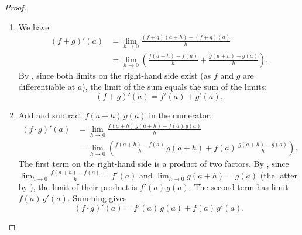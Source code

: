 \begin{proof}
    \begin{enumerate}
        \item We have
            \begin{align*}
                (f+g)'(a) &= \lim_{h \to 0} \frac{(f+g)(a+h) - (f+g)(a)}{h} \\
                &= \lim_{h \to 0} \left( \frac{f(a+h) - f(a)}{h} + \frac{g(a+h) - g(a)}{h} \right).
            \end{align*}
            By , since both limits on the right-hand side exist (as $f$ and $g$ are differentiable at $a$), the limit of the sum equals the sum of the limits:
            $$(f+g)'(a) = f'(a) + g'(a).$$

        \item Add and subtract $f(a+h)\,g(a)$ in the numerator:
            \begin{align*}
                (f\cdot g)'(a) &= \lim_{h \to 0} \frac{f(a+h)\,g(a+h) - f(a)\,g(a)}{h} \\
                &= \lim_{h \to 0} \left( \frac{f(a+h) - f(a)}{h}\,g(a+h) + f(a)\,\frac{g(a+h) - g(a)}{h} \right).
            \end{align*}
            The first term on the right-hand side is a product of two factors. By , since $\lim_{h \to 0} \frac{f(a+h) - f(a)}{h} = f'(a)$ and $\lim_{h \to 0} g(a+h) = g(a)$ (the latter by ), the limit of their product is $f'(a)\,g(a)$. The second term has limit $f(a)\,g'(a)$. Summing gives
            $$(f\cdot g)'(a) = f'(a)\,g(a) + f(a)\,g'(a).$$


\end{enumerate}
\end{proof}
